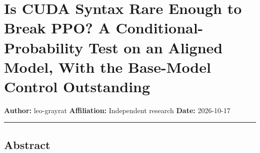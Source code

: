 \documentclass[
  11pt,
]{article}
\author{}
\date{}
\begin{document}
\hypertarget{is-cuda-syntax-rare-enough-to-break-ppo-a-conditional-probability-test-on-an-aligned-model-with-the-base-model-control-outstanding}{%
\section{Is CUDA Syntax Rare Enough to Break PPO? A
Conditional-Probability Test on an Aligned Model, With the Base-Model
Control
Outstanding}\label{is-cuda-syntax-rare-enough-to-break-ppo-a-conditional-probability-test-on-an-aligned-model-with-the-base-model-control-outstanding}}

\textbf{Author:} leo-grayrat \textbf{Affiliation:} Independent research
\textbf{Date:} 2026-10-17

\begin{center}\rule{0.5\linewidth}{0.5pt}\end{center}

\hypertarget{abstract}{%
\subsection{Abstract}\label{abstract}}
\end{document}
